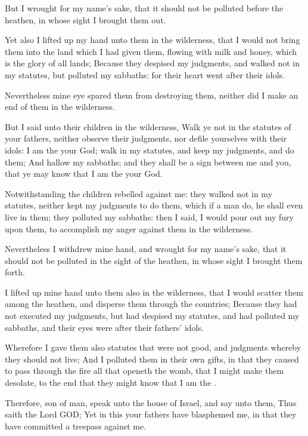 \Verse But I wrought for my name's sake, that it should not be polluted before the heathen, in whose sight I brought them out.

\Verse Yet also I lifted up my hand unto them in the wilderness, that I would not bring them into the land which I had given them, flowing with milk and honey, which is the glory of all lands; \Verse Because they despised my judgments, and walked not in my statutes, but polluted my sabbaths: for their heart went after their idols.

\Verse Nevertheless mine eye spared them from destroying them, neither did I make an end of them in the wilderness.

\Verse But I said unto their children in the wilderness, Walk ye not in the statutes of your fathers, neither observe their judgments, nor defile yourselves with their idols: \Verse I am the \LORD your God; walk in my statutes, and keep my judgments, and do them; \Verse And hallow my sabbaths; and they shall be a sign between me and you, that ye may know that I am the \LORD your God.

\Verse Notwithstanding the children rebelled against me: they walked not in my statutes, neither kept my judgments to do them, which if a man do, he shall even live in them; they polluted my sabbaths: then I said, I would pour out my fury upon them, to accomplish my anger against them in the wilderness.

\Verse Nevertheless I withdrew mine hand, and wrought for my name's sake, that it should not be polluted in the sight of the heathen, in whose sight I brought them forth.

\Verse I lifted up mine hand unto them also in the wilderness, that I would scatter them among the heathen, and disperse them through the countries; \Verse Because they had not executed my judgments, but had despised my statutes, and had polluted my sabbaths, and their eyes were after their fathers' idols.

\Verse Wherefore I gave them also statutes that were not good, and judgments whereby they should not live; \Verse And I polluted them in their own gifts, in that they caused to pass through the fire all that openeth the womb, that I might make them desolate, to the end that they might know that I am the \LORD.

\Verse Therefore, son of man, speak unto the house of Israel, and say unto them, Thus saith the Lord GOD; Yet in this your fathers have blasphemed me, in that they have committed a trespass against me.

